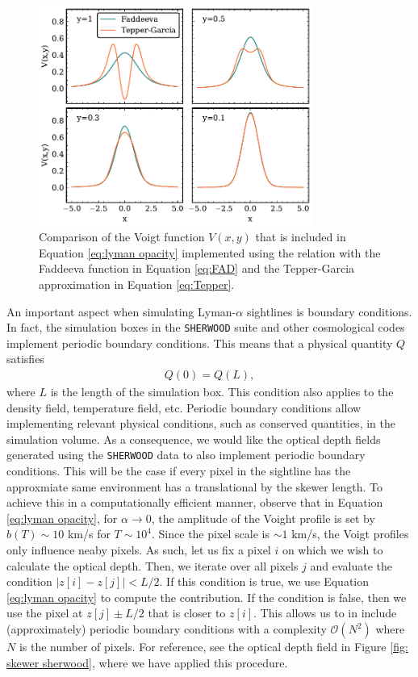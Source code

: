 \begin{figure}
        \centering
        \includegraphics[width=0.8\textwidth]{img/ML/TP-FA.pdf}
        \caption{Comparison of the Voigt function $V(x,y)$ that is included in Equation \ref{eq:lyman opacity} implemented using the relation with the Faddeeva function in Equation \ref{eq:FAD} and the Tepper-Garcia approximation in Equation \ref{eq:Tepper}.}
        \label{fig: VOIGT APPROX}     
\end{figure}

An important aspect when simulating Lyman-$\alpha$ sightlines is boundary conditions. In fact, the simulation boxes in the \texttt{SHERWOOD} suite and other cosmological codes implement periodic boundary conditions. This means that a physical quantity $Q$ satisfies
\begin{eqnarray}
        Q(0)=Q(L),
\end{eqnarray}
where $L$ is the length of the simulation box. This condition also applies to the density field, temperature field, etc. Periodic boundary conditions allow implementing relevant physical conditions, such as conserved quantities, in the simulation volume. As a consequence, we would like the optical depth fields generated using the \texttt{SHERWOOD} data to also implement periodic boundary conditions. This will be the case if every pixel in the sightline has the approxmiate same environment has a translational by the skewer length. To achieve this in a computationally efficient manner, observe that in Equation \ref{eq:lyman opacity}, for $\alpha\to 0$, the amplitude of the Voight profile is set by $b(T)\sim 10$ km/s for $T\sim 10^4$. Since the pixel scale is $\sim 1$ km/s, the Voigt profiles only influence neaby pixels. As such, let us fix a pixel $i$ on which we wish to calculate the optical depth. Then, we iterate over all pixels $j$ and evaluate the condition $|z[i]-z[j]| < L/2$. If this condition is true, we use Equation \ref{eq:lyman opacity} to compute the contribution. If the condition is false, then we use the pixel at $z[j]\pm L/2$ that is closer to $z[i]$. This allows us to in include (approximately) periodic boundary conditions with a complexity $\mathcal{O}(N^2)$ where $N$ is the number of pixels. For reference, see the optical depth field in Figure \ref{fig: skewer sherwood}, where we have applied this procedure.



